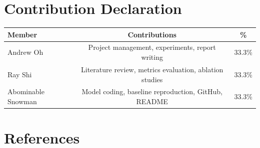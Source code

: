 \documentclass[11pt, letterpaper]{article}
\begin{document}
\section{Contribution Declaration}

\begin{tabular}{lcc}
\toprule
\textbf{Member} & \textbf{Contributions} & \textbf{\%} \\
\midrule
{Andrew Oh} & Project management, experiments, report writing & 33.3\% \\
{Ray Shi} & Literature review, metrics evaluation, ablation studies & 33.3\% \\
{Abominable Snowman} & Model coding, baseline reproduction, GitHub, README & 33.3\% \\
\bottomrule
\end{tabular}

\section{References}
\end{document}
